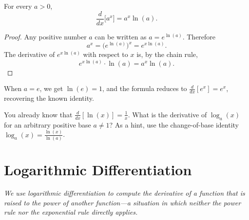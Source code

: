 \begin{theorem}[Derivative of $a^{x}$]
\label{thm:4-6}
For every $a > 0$,
\[
  \frac{d}{dx}\bigl[a^{x}\bigr] = a^{x} \ln(a).
\]
\end{theorem}

\begin{proof}
Any positive number $a$ can be written as $a = e^{\ln(a)}$.  Therefore
\[
  a^{x} = \bigl(e^{\ln(a)}\bigr)^{x} = e^{x \ln(a)}.
\]
The derivative of $e^{x \ln(a)}$ with respect to $x$ is, by the chain rule,
\[
  e^{x \ln(a)} \cdot \ln(a) = a^{x} \ln(a).
\]
\end{proof}

\begin{remark}
When $a = e$, we get $\ln(e) = 1$, and the formula reduces to $\frac{d}{dx}[e^{x}] = e^{x}$, recovering the known identity.
\end{remark}

\begin{remark}
You already know that $\frac{d}{dx}[\ln(x)] = \frac{1}{x}$.  What is the derivative of $\log_{a}(x)$ for an arbitrary positive base $a \neq 1$?  As a hint, use the change-of-base identity $\log_{a}(x) = \frac{\ln(x)}{\ln(a)}$.
\end{remark}

\section{Logarithmic Differentiation}
\label{sec:4.9}

\textit{We use logarithmic differentiation to compute the derivative of a function that is raised to the power of another function---a situation in which neither the power rule nor the exponential rule directly applies.}

